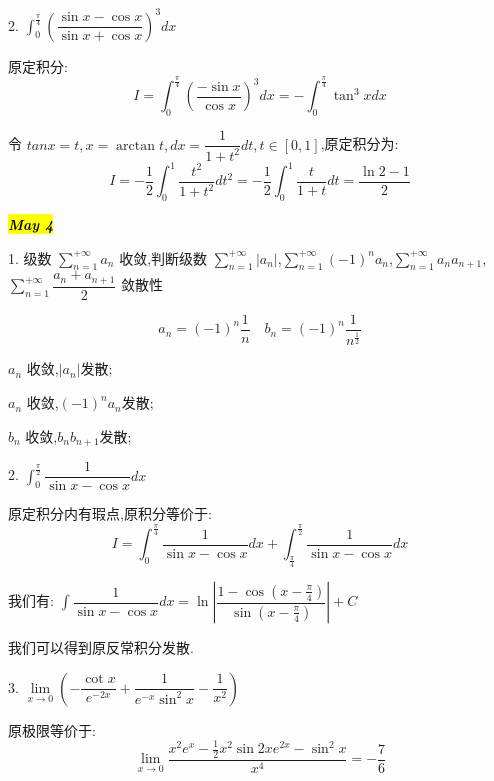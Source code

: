 
2. $\int_{0}^{\frac{\pi}{4}}\left(\dfrac{\sin x-\cos x}{\sin x+\cos x} \right)^3dx $
\begin{solution}
	
	原定积分: 
	$$I=\int_{0}^{\frac{\pi}{4}}\left(\frac{-\sin x}{\cos x}\right)^3dx=-\int_{0}^{\frac{\pi}{4}}\tan^{3} xdx$$
	
	令 $tan x=t,x=\arctan t,dx=\dfrac{1}{1+t^2}dt,t\in[0,1]$,原定积分为: 
	$$I=-\frac{1}{2}\int_{0}^{1}\frac{t^2}{1+t^2}dt^2=-\frac{1}{2}\int_{0}^{1}\frac{t}{1+t}dt=\frac{\ln2-1}{2}$$
	
\end{solution}


\hl{\textbf{\textit{May 4}}}

1. 级数 $\sum\limits_{n=1}^{+\infty}a_{n}$ 收敛,判断级数 $\sum\limits_{n=1}^{+\infty}|a_{n}|$,$\sum\limits_{n=1}^{+\infty}(-1)^{n}a_{n}$,$\sum\limits_{n=1}^{+\infty}a_{n}a_{n+1}$,$\sum\limits_{n=1}^{+\infty}\dfrac{a_{n}+a_{n+1}}{2}$ 敛散性
\begin{solution}
	
	$$a_{n}=(-1)^n\frac{1}{n}\quad b_{n}=(-1)^n\frac{1}{n^{\frac{1}{2}}}$$
	
	$a_{n}$ 收敛,$|a_{n}|$发散;
	
	$a_{n}$ 收敛,$(-1)^na_{n}$发散;
	
	$b_{n}$ 收敛,$b_{n}b_{n+1}$发散;
\end{solution}


2. $\int_{0}^{\frac{\pi}{2}}\dfrac{1}{\sin x-\cos x}dx$
\begin{solution}
	
	原定积分内有瑕点,原积分等价于: 
	$$I=\int_{0}^{\frac{\pi}{4}}\frac{1}{\sin x-\cos x}dx+\int_{\frac{\pi}{4}}^{\frac{\pi}{2}}\frac{1}{\sin x-\cos x}dx$$
	
	我们有: $\int\dfrac{1}{\sin x-\cos x}dx=\ln|\dfrac{1-\cos(x-\frac{\pi}{4})}{\sin(x-\frac{\pi}{4})}|+C$
	
	我们可以得到原反常积分发散.
\end{solution}


3. $\lim\limits_{x\rightarrow 0}\left( -\dfrac{\cot x}{e^{-2x}}+\dfrac{1}{e^{-x}\sin^2 x}-\dfrac{1}{x^2}\right) $
\begin{solution}
	
	原极限等价于: 
	$$\lim\limits_{x\rightarrow 0}\frac{x^2e^{x}-\frac{1}{2}x^2\sin 2xe^{2x}-\sin^2 x}{x^4}=-\frac{7}{6}$$
\end{solution}

